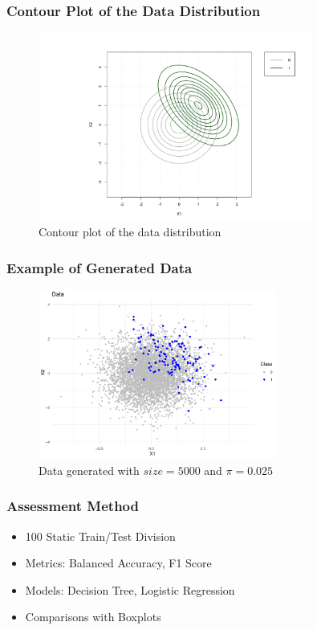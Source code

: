 \documentclass{beamer}
\begin{document}
\begin{frame}
  \frametitle{Contour Plot of the Data Distribution}
  \begin{figure}
    \centering
    \includegraphics[width=0.8\textwidth]{figures/cont_plot.png}
    \caption{Contour plot of the data distribution}
    \label{fig:contour_data}
  \end{figure}
\end{frame}

\begin{frame}
  \frametitle{Example of Generated Data}
  \begin{figure}
    \centering
    \includegraphics[width=0.7\textwidth]{images/data.pdf}
    \caption{Data generated with $size = 5000$ and $\pi = 0.025$}
    \label{fig:data}
  \end{figure}
\end{frame}

\begin{frame}
  \frametitle{Assessment Method}
  \begin{itemize}
    \item 100 Static Train/Test Division
    \item Metrics: Balanced Accuracy, F1 Score
    \item Models: Decision Tree, Logistic Regression
    \item Comparisons with Boxplots
  \end{itemize}
\end{frame}
\end{document}
